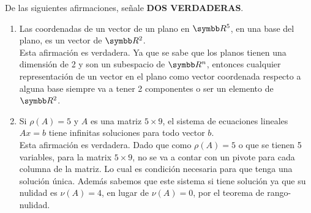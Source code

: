 \item De las siguientes afirmaciones, señale \textbf{DOS VERDADERAS}.
    \begin{enumerate}[label=\listAlph]
        \item Las coordenadas de un vector de un plano en \(\realR^5\), en una base del plano, es un vector de \(\realR^2\). \\
            Esta afirmación es verdadera. Ya que se sabe que los planos tienen una dimensión de 2 y son un subespacio de \(\realR^n\), 
            entonces cualquier representación de un vector en el plano como vector coordenada respecto a alguna base siempre va a tener 
            2 componentes o ser un elemento de \(\realR^2\).
        \setcounter{enumii}{4}
        \item Si \(\rho(A) = 5\) y \(A\) es una matriz \(5 \times 9\), el sistema de ecuaciones lineales \(Ax = b\) tiene infinitas soluciones para todo vector \(b\). \\
            Esta afirmación es verdadera. Dado que como \(\rho(A) = 5\) o que se tienen 5 variables, para la matrix \(5 \times 9\), no se va a contar con un pivote 
            para cada columna de la matriz. Lo cual es condición necesaria para que tenga una solución única. Además sabemos que este sistema si tiene solución ya que 
            su nulidad es \(\nu(A) = 4\), en lugar de \(\nu(A) = 0\), por el teorema de rango-nulidad.
    \end{enumerate}
